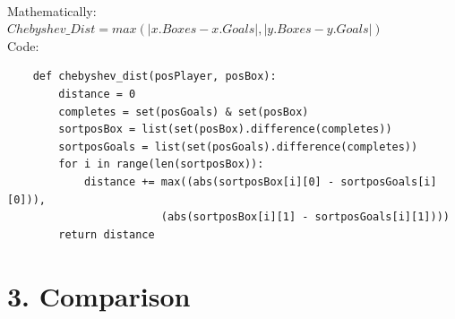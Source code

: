 \documentclass[english, a4paper,12pt]{article}
\begin{document}
\vspace*{3mm}
\\
Mathematically: 
\vspace*{3mm}\\
\hspace*{10mm}$Chebyshev\_Dist = max(|x.Boxes - x.Goals|, |y.Boxes - y.Goals|)$\\
Code:
\begin{verbatim}
    def chebyshev_dist(posPlayer, posBox):
        distance = 0
        completes = set(posGoals) & set(posBox)
        sortposBox = list(set(posBox).difference(completes))
        sortposGoals = list(set(posGoals).difference(completes))
        for i in range(len(sortposBox)):
            distance += max((abs(sortposBox[i][0] - sortposGoals[i][0])),
                        (abs(sortposBox[i][1] - sortposGoals[i][1])))
        return distance
\end{verbatim}
\section*{3. Comparison}
\end{document}
